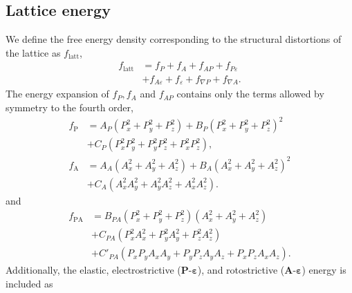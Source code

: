 \documentclass[%
 reprint,
superscriptaddress,
 amsmath,amssymb,
prb,
]{revtex4-1}
\begin{document}
\subsection{Lattice energy}\label{sec:latticeE}

We define the free energy density corresponding to the structural distortions of the lattice as $f_\mathrm{latt}$,
%
\begin{align}\label{eqn:FE_en}
    f_\mathrm{latt} &= f_P + f_A + f_{AP} + f_{P\varepsilon} \\ \nonumber
    &+ f_{A\varepsilon} + f_\varepsilon + f_{\nabla P} + f_{\nabla A}. 
\end{align}
%
The energy expansion of $f_P, f_A$ and $f_{AP}$ contains only the terms allowed by symmetry to the fourth order\cite{Fedorova2022},
%
\begin{align}\label{eqn:FE_bulk}
    f_\mathrm{P} &= A_P \left(P_x^2 + P_y^2 + P_z^2 \right) + B_P \left(P_x^2 +  P_y^2 + P_z^2\right)^2 \\ \nonumber
    &+ C_P \left(P_x^2 P_y^2 + P_y^2 P_z^2 + P_x^2 P_z^2\right), \\ \nonumber
   f_\mathrm{A} &= A_A \left(A_x^2 + A_y^2 + A_z^2 \right) + B_A \left(A_x^2 +  A_y^2 + A_z^2\right)^2 \\ \nonumber
    &+ C_A \left(A_x^2 A_y^2 + A_y^2 A_z^2 + A_x^2 A_z^2\right).
\end{align}
%
and
%
\begin{align}\label{eqn:FE_coupled}
    f_\mathrm{PA} &= B_{PA} \left(P_x^2 + P_y^2 + P_z^2\right)\left(A_x^2 + A_y^2 + A_z^2\right) \\ \nonumber
    &+ C_{PA} \left(P_x^2 A_x^2 + P_y^2 A_y^2 + P_z^2 A_z^2\right) \\ \nonumber
    &+ C'_{PA} \left(P_x P_y A_x A_y + P_y P_z A_y A_z + P_x P_z A_x A_z \right).
\end{align}
%
Additionally, the elastic, electrostrictive ($\mathbf{P}$-$\bm{\varepsilon}$), and rotostrictive ($\mathbf{A}$-$\bm{\varepsilon}$) energy is included as
%
\end{document}
